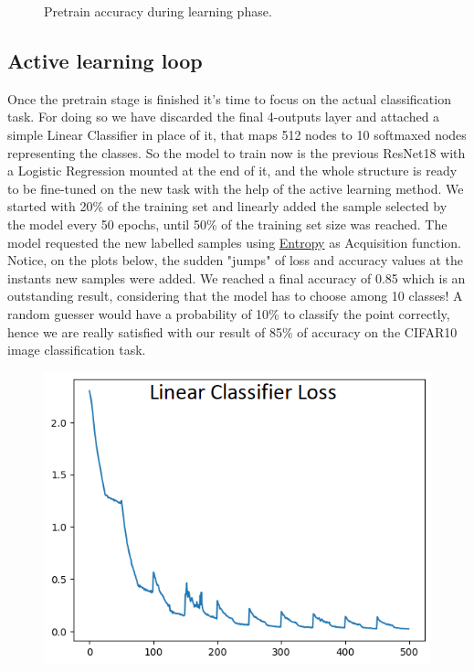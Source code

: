 \documentclass{article}
\begin{document}
\begin{flushleft}
\begin{figure}[h]
    \caption{ Pretrain accuracy during learning phase.}
\end{figure}
\subsection{Active learning loop}
Once the pretrain stage is finished it's time to focus on the actual classification task.
 For doing so we have discarded the final 4-outputs layer and attached a simple Linear Classifier in place of it, 
that maps 512 nodes to 10 softmaxed nodes representing the classes.
So the model to train now is the previous ResNet18 with a Logistic Regression mounted at the end of it, and the whole structure is 
ready to be fine-tuned on the new task with the help of the active learning method.
We started with 20\% of the training set and linearly added the sample selected by the model every 50 epochs, until 50\% of the training set size was reached. The model requested the new labelled samples
using \hyperref[sec:entropy]{Entropy} as Acquisition function. Notice, on the plots below, the sudden "jumps" of loss and accuracy values at the instants new samples were added.
We reached a final accuracy of 0.85 which is an outstanding result, considering that the model has to choose among 10 classes!
A random guesser would have a probability of 10\% to classify the point correctly, hence we are really satisfied with our result of 85\% of accuracy on the CIFAR10 image classification task.
\begin{figure}[h]
    \centering
    \includegraphics[scale=1.25]{lcsl_500_20_50_loss}

\end{figure}
\end{flushleft}
\end{document}
